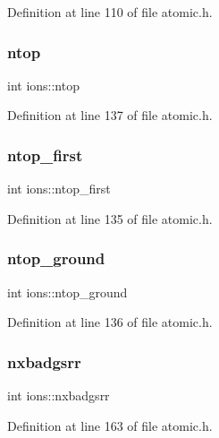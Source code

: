 Definition at line 110 of file atomic.\+h.

\mbox{\label{structions_ae8e97395b91ddca6262ef7246b514b73}} 
\subsubsection{\texorpdfstring{ntop}{ntop}}
{\footnotesize\ttfamily int ions\+::ntop}



Definition at line 137 of file atomic.\+h.

\mbox{\label{structions_adb21dc2f3509a844567181c918719eaa}} 
\subsubsection{\texorpdfstring{ntop\+\_\+first}{ntop\_first}}
{\footnotesize\ttfamily int ions\+::ntop\+\_\+first}



Definition at line 135 of file atomic.\+h.

\mbox{\label{structions_a7a20d53750d8e98067c466d385ff6c49}} 
\subsubsection{\texorpdfstring{ntop\+\_\+ground}{ntop\_ground}}
{\footnotesize\ttfamily int ions\+::ntop\+\_\+ground}



Definition at line 136 of file atomic.\+h.

\mbox{\label{structions_ae31f2cb1312fef28e47a663fee995f39}} 
\subsubsection{\texorpdfstring{nxbadgsrr}{nxbadgsrr}}
{\footnotesize\ttfamily int ions\+::nxbadgsrr}



Definition at line 163 of file atomic.\+h.

